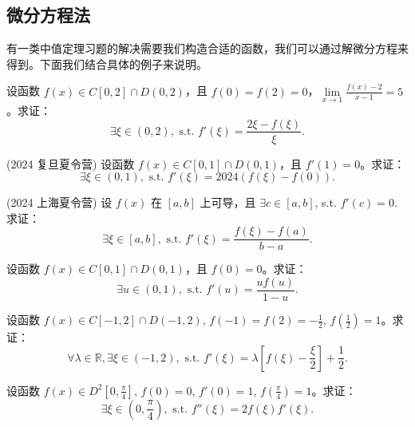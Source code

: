 \documentclass[lang=cn,10pt,thmcnt=section]{elegantbook}
\begin{document}
\subsection{微分方程法}
有一类中值定理习题的解决需要我们构造合适的函数，我们可以通过解微分方程来得到。下面我们结合具体的例子来说明。
\begin{example}
	设函数 \( f(x) \in C[0,2] \cap D(0,2) \)，且 \( f(0) = f(2) = 0 \)，\(\lim\limits_{x \to 1} \frac{f(x) - 2}{x - 1} = 5\)。求证：
\[ \exists \xi \in (0,2), \text{ s.t. } f'(\xi) = \frac{2\xi - f(\xi)}{\xi}. \]
\end{example}
\begin{example}
	(2024 复旦夏令营) 设函数 \( f(x) \in C[0,1] \cap D(0,1) \)，且 \( f'(1) = 0 \)。求证：
\[ \exists \xi \in (0,1), \text{ s.t. } f'(\xi) = 2024(f(\xi) - f(0)). \]
\end{example}
\begin{example}
	(2024 上海夏令营) 设 \( f(x) \) 在 \([a,b]\) 上可导，且 \(\exists c \in [a,b]\), s.t. \( f'(c) = 0 \). 求证：
\[ \exists \xi \in [a,b], \text{ s.t. } f'(\xi) = \frac{f(\xi) - f(a)}{b - a}. \]
\end{example}
\begin{example}
	设函数 \( f(x) \in C[0,1] \cap D(0,1) \)，且 \( f(0) = 0 \)。求证：
    \[ \exists u \in (0,1), \text{ s.t. } f'(u) = \frac{u f(u)}{1 - u}. \]
\end{example}
\begin{example}
	设函数 \( f(x) \in C[-1,2] \cap D(-1,2) \), \( f(-1) = f(2) = -\frac{1}{2} \), \( f\left(\frac{1}{2}\right) = 1 \)。求证：
    \[ \forall \lambda \in \mathbb{R}, \exists \xi \in (-1,2), \text{ s.t. } f'(\xi) = \lambda \left[f(\xi) - \frac{\xi}{2}\right] + \frac{1}{2}. \]
\end{example}
\begin{example}
	设函数 \( f(x) \in D^2\left[0,\frac{\pi}{4}\right] \), \( f(0) = 0 \), \( f'(0) = 1 \), \( f\left(\frac{\pi}{4}\right) = 1 \)。求证：
    \[ \exists \xi \in \left(0,\frac{\pi}{4}\right), \text{ s.t. } f''(\xi) = 2f(\xi)f'(\xi). \]
\end{example}
\end{document}
